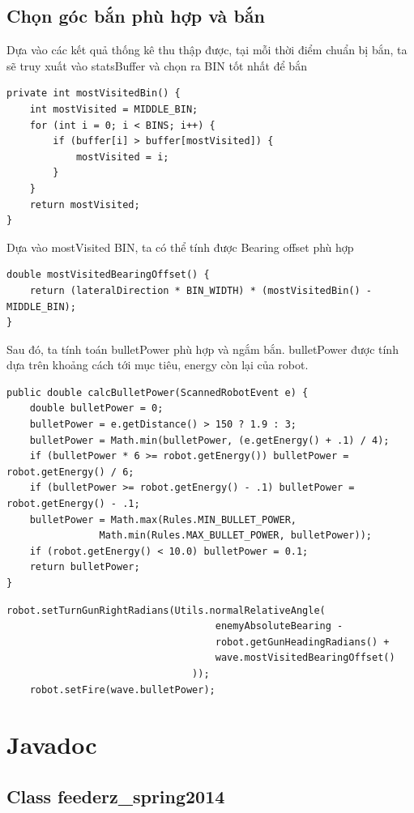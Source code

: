 \documentclass[14pt]{article}
\begin{document}
\subsection{Chọn góc bắn phù hợp và bắn}
Dựa vào các kết quả thống kê thu thập được, tại mỗi thời điểm chuẩn bị bắn, ta sẽ truy xuất vào statsBuffer và chọn ra BIN tốt nhất để bắn
\begin{lstlisting}[caption = mostVisitedBin, frame = single]
private int mostVisitedBin() {
	int mostVisited = MIDDLE_BIN;
	for (int i = 0; i < BINS; i++) {
		if (buffer[i] > buffer[mostVisited]) {
			mostVisited = i;
		}
	}
	return mostVisited;
}	
\end{lstlisting}
Dựa vào mostVisited BIN, ta có thể tính được Bearing offset phù hợp
\begin{lstlisting}[caption = mostVisitedBearingOffset, frame = single]
double mostVisitedBearingOffset() {
	return (lateralDirection * BIN_WIDTH) * (mostVisitedBin() - MIDDLE_BIN);
}
\end{lstlisting}
Sau đó, ta tính toán bulletPower phù hợp và ngắm bắn. bulletPower được tính dựa trên khoảng cách tới mục tiêu, energy còn lại của robot.
\begin{lstlisting}[caption = tính bulletPower, frame = single]
public double calcBulletPower(ScannedRobotEvent e) {
	double bulletPower = 0;
	bulletPower = e.getDistance() > 150 ? 1.9 : 3;
	bulletPower = Math.min(bulletPower, (e.getEnergy() + .1) / 4);
	if (bulletPower * 6 >= robot.getEnergy()) bulletPower = robot.getEnergy() / 6;
	if (bulletPower >= robot.getEnergy() - .1) bulletPower = robot.getEnergy() - .1;
	bulletPower = Math.max(Rules.MIN_BULLET_POWER, 
				Math.min(Rules.MAX_BULLET_POWER, bulletPower));
	if (robot.getEnergy() < 10.0) bulletPower = 0.1;
	return bulletPower;
}
\end{lstlisting}
\begin{lstlisting}[caption = ngắm bắn, frame = single]
	robot.setTurnGunRightRadians(Utils.normalRelativeAngle(
									enemyAbsoluteBearing -
									robot.getGunHeadingRadians() +
									wave.mostVisitedBearingOffset()
								));
	robot.setFire(wave.bulletPower);
\end{lstlisting}
\section{Javadoc}
\subsection{Class feederz\_spring2014}
\end{document}
